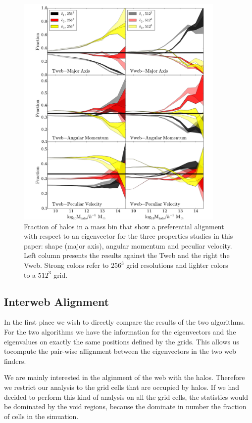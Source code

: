 \documentclass[usenatbib]{mn2e}
\begin{document}
\begin{figure}
\includegraphics[width=0.9\textwidth]{Fig0.pdf}
\caption{Fraction of halos in a mass bin that show a preferential
  alignment with respect to an eigenvector for the three properties
  studies in this paper: shape (major axis), angular momentum and
  peculiar velocity. Left column presents the results against the Tweb
  and the right the Vweb. Strong colors refer to $256^3$ grid
  resolutions and lighter colors to a $512^3$ grid.
\label{fig:preferential}}
\end{figure}


\subsection{Interweb Alignment}

In the first place we wish to directly compare the results of the two
algorithms. For the two algorithms we have the information for the
eigenvectors and the eigenvalues on exactly the same positions defined
by the grids. This allows us tocompute the pair-wise allignment
between the eigenvectors in the two web finders. 

We are mainly interested in the alginment of the web with
the halos. Therefore we restrict our analysis to the grid cells that are
occupied by halos. If we had decided to perform this kind of analysis
on all the grid cells, the statistics would be dominated by the void
regions, because the dominate in number the fraction of cells in the
simuation.
\end{document}
